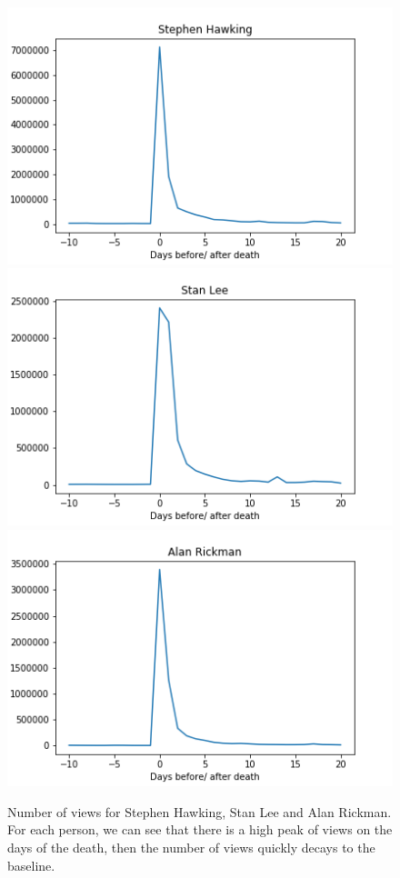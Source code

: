 \documentclass[conference]{IEEEtran}
\begin{document}
\begin{figure}[!htb]
  \includegraphics[width=\linewidth]{viewsSH.png}
\endminipage\hfill
{}
  \includegraphics[width=\linewidth]{viewsSL.png}
\endminipage\hfill
{}%
  \includegraphics[width=\linewidth]{viewsAR.png}
\endminipage
\caption{Number of views for Stephen Hawking, Stan Lee and Alan Rickman. For each person, we can see that there is a high peak of views on the days of the death, then the number of views quickly decays to the baseline.  }
\end{figure}
\end{document}
